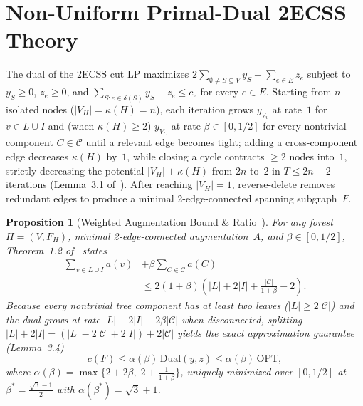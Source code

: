 \documentclass[11pt,twocolumn]{article}
\newtheorem{proposition}{Proposition}
\begin{document}
\section{Non-Uniform Primal-Dual 2ECSS Theory}\label{sec:prelim}
The dual of the 2ECSS cut LP maximizes $2\sum_{\emptyset \neq S \subsetneq V} y_S - \sum_{e \in E} z_e$ subject to $y_S \ge 0$, $z_e \ge 0$, and $\sum_{S : e \in \delta(S)} y_S - z_e \le c_e$ for every $e \in E$. Starting from $n$ isolated nodes ($|V_H| = \kappa(H) = n$), each iteration grows $y_{V_v}$ at rate~$1$ for $v \in L \cup I$ and (when $\kappa(H) \ge 2$) $y_{V_C}$ at rate $\beta \in [0, 1/2]$ for every nontrivial component $C \in \mathcal{C}$ until a relevant edge becomes tight; adding a cross-component edge decreases $\kappa(H)$ by~$1$, while closing a cycle contracts $\ge 2$ nodes into~$1$, strictly decreasing the potential $|V_H| + \kappa(H)$ from $2n$ to~$2$ in $T \le 2n - 2$ iterations (Lemma~3.1 of~\cite{danciu2026twoconnected}). After reaching $|V_H| = 1$, reverse-delete removes redundant edges to produce a minimal 2-edge-connected spanning subgraph~$F$.

\begin{proposition}[Weighted Augmentation Bound \& Ratio~\cite{danciu2026twoconnected}]\label{prop:thm12}
For any forest $H = (V, F_H)$, minimal 2-edge-connected augmentation~$A$, and $\beta \in [0, 1/2]$, Theorem~1.2 of~\cite{danciu2026twoconnected} states
\begin{equation}
\begin{aligned}
  \sum_{v \in L \cup I} a(v) &+ \beta \sum_{C \in \mathcal{C}} a(C) \\
  &\le 2(1+\beta)\!\left(|L| + 2|I| + \frac{|\mathcal{C}|}{1+\beta} - 2\right).
\end{aligned}
  \label{eq:thm12}
\end{equation}
Because every nontrivial tree component has at least two leaves ($|L| \ge 2|\mathcal{C}|$) and the dual grows at rate $|L| + 2|I| + 2\beta|\mathcal{C}|$ when disconnected, splitting $|L| + 2|I| = (|L| - 2|\mathcal{C}| + 2|I|) + 2|\mathcal{C}|$ yields the exact approximation guarantee (Lemma~3.4)
\begin{equation}
  c(F) \le \alpha(\beta)\,\mathrm{Dual}(y,z) \le \alpha(\beta)\,\mathrm{OPT},
  \label{eq:ratio-bound}
\end{equation}
where $\alpha(\beta) = \max\!\bigl\{2 + 2\beta,\; 2 + \frac{1}{1+\beta}\bigr\}$, uniquely minimized over $[0,1/2]$ at $\beta^* = \frac{\sqrt{3}-1}{2}$ with $\alpha(\beta^*) = \sqrt{3}+1$.
\end{proposition}
\end{document}
